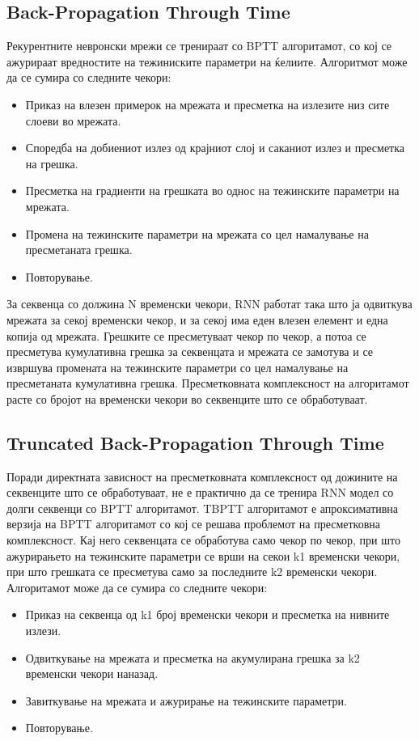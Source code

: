 \subsection{Back-Propagation Through Time}
Рекурентните невронски мрежи се тренираат со BPTT алгоритамот, со кој се ажурираат вредностите на тежиниските параметри на ќелиите. Алгоритмот може да се сумира со следните чекори:
\begin{itemize}
    \item Приказ на влезен примерок на мрежата и пресметка на излезите низ сите слоеви во мрежата.
    \item Споредба на добиениот излез од крајниот слој и саканиот излез и пресметка на грешка.
    \item Пресметка на градиенти на грешката во однос на тежинските параметри на мрежата.
    \item Промена на тежинските параметри на мрежата со цел намалување на пресметаната грешка.
    \item Повторување.
\end{itemize}

За секвенца со должина N временски чекори, RNN работат така што ја одвиткува мрежата за секој временски чекор, и за секој има еден влезен елемент и една копија од мрежата. Грешките се пресметуваат чекор по чекор, а потоа се пресметува кумулативна грешка за секвенцата и мрежата се замотува и се извршува промената на тежинските параметри со цел намалување на пресметаната кумулативна грешка. Пресметковната комплексност на алгоритамот расте со бројот на временски чекори во секвенците што се обработуваат. 

\subsection{Truncated Back-Propagation Through Time}

Поради директната зависност на пресметковната комплексност од дожините на секвенците што се обработуваат, не е практично да се тренира RNN модел со долги секвенци со BPTT алгоритамот. TBPTT алгоритамот е апроксимативна верзија на BPTT алгоритамот со кој се решава проблемот на пресметковна комплексност. Кај него секвенцата се обработува само чекор по чекор, при што ажурирањето на тежинските параметри се врши на секои k1 временски чекори, при што грешката се пресметува само за последните k2 временски чекори. Алгоритамот може да се сумира со следните чекори:
\begin{itemize}
    \item Приказ на секвенца од k1 број временски чекори и пресметка на нивните излези.
    \item Одвиткување на мрежата и пресметка на акумулирана грешка за k2 временски чекори наназад.
    \item Завиткување на мрежата и ажурирање на тежинските параметри.
    \item Повторување.
\end{itemize}

